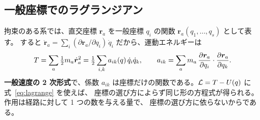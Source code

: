\subsection{一般座標でのラグランジアン}\label{sec:gen-lagrangian}

拘束のある系では、直交座標 $\bm r_a$ を一般座標 $q_i$ の関数 $\bm r_a(q_1,\dots,q_s)$ として表す。
すると $\dot{\bm r}_a=\sum_i(\partial\bm r_a/\partial q_i)\,\dot q_i$ だから、運動エネルギーは
\begin{equation}
  T=\sum_a\tfrac12m_a\dot{\bm r}_a^2=\tfrac12\sum_{i,k}a_{ik}(q)\,\dot q_i\dot q_k,
  \qquad a_{ik}=\sum_am_a\,\frac{\partial \bm r_a}{\partial q_i}\cdot\frac{\partial \bm r_a}{\partial q_k}.
  \label{eq:T-general}
\end{equation}
\textbf{一般速度の 2 次形式}で、係数 $a_{ik}$ は座標だけの関数である。$\mathcal{L}=T-U(q)$ に式~\eqref{eq:lagrange} を使えば、
座標の選び方によらず同じ形の方程式が得られる。作用は経路に対して 1 つの数を与える量で、
座標の選び方に依らないからである。

